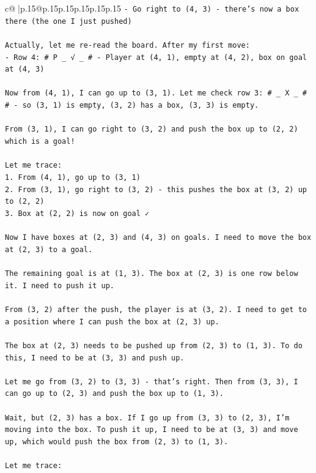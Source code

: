 \documentclass{article}
\begin{document}
{\begin{supertabular}{c@{$\;$}|p{.15\linewidth}@{}p{.15\linewidth}p{.15\linewidth}p{.15\linewidth}p{.15\linewidth}p{.15\linewidth}}
{{{\texttt{{-} Go right to (4, 3) {-} there's now a box there (the one I just pushed)} \\
\\ 
\texttt{Actually, let me re{-}read the board. After my first move:} \\
\texttt{{-} Row 4: \# P \_ √ \_ \# {-} Player at (4, 1), empty at (4, 2), box on goal at (4, 3)} \\
\\ 
\texttt{Now from (4, 1), I can go up to (3, 1). Let me check row 3: \# \_ X \_ \# \# {-} so (3, 1) is empty, (3, 2) has a box, (3, 3) is empty.} \\
\\ 
\texttt{From (3, 1), I can go right to (3, 2) and push the box up to (2, 2) which is a goal!} \\
\\ 
\texttt{Let me trace:} \\
\texttt{1. From (4, 1), go up to (3, 1)} \\
\texttt{2. From (3, 1), go right to (3, 2) {-} this pushes the box at (3, 2) up to (2, 2)} \\
\texttt{3. Box at (2, 2) is now on goal ✓} \\
\\ 
\texttt{Now I have boxes at (2, 3) and (4, 3) on goals. I need to move the box at (2, 3) to a goal.} \\
\\ 
\texttt{The remaining goal is at (1, 3). The box at (2, 3) is one row below it. I need to push it up.} \\
\\ 
\texttt{From (3, 2) after the push, the player is at (3, 2). I need to get to a position where I can push the box at (2, 3) up.} \\
\\ 
\texttt{The box at (2, 3) needs to be pushed up from (2, 3) to (1, 3). To do this, I need to be at (3, 3) and push up.} \\
\\ 
\texttt{Let me go from (3, 2) to (3, 3) {-} that's right. Then from (3, 3), I can go up to (2, 3) and push the box up to (1, 3).} \\
\\ 
\texttt{Wait, but (2, 3) has a box. If I go up from (3, 3) to (2, 3), I'm moving into the box. To push it up, I need to be at (3, 3) and move up, which would push the box from (2, 3) to (1, 3).} \\
\\ 
\texttt{Let me trace:} \\
}}}
\end{supertabular}}
\end{document}
